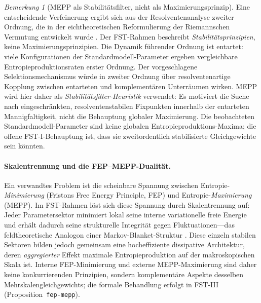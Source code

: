 \documentclass[12pt,a4paper]{article}
\theoremstyle{remark}
\newtheorem{remark}{Bemerkung}
\begin{document}
\begin{remark}[MEPP als Stabilit\"atsfilter, nicht als Maximierungsprinzip]
\label{rem:mepp-stability-filter}
Eine entscheidende Verfeinerung ergibt sich aus der Resolventenanalyse zweiter Ordnung, die in der eichtheoretischen Reformulierung der Riemannschen Vermutung entwickelt wurde \citep{GeigerRH2026b}. Der FST-Rahmen beschreibt \emph{Stabilit\"atsprinzipien}, keine Maximierungsprinzipien. Die Dynamik f\"uhrender Ordnung ist entartet: viele Konfigurationen der Standardmodell-Parameter ergeben vergleichbare Entropieproduktionsraten erster Ordnung. Der vorgeschlagene Selektionsmechanismus w\"urde in zweiter Ordnung \"uber resolventenartige Kopplung zwischen entarteten und komplement\"aren Unterr\"aumen wirken. MEPP wird hier daher als \emph{Stabilit\"atsfilter-Heuristik} verwendet: Es motiviert die Suche nach eingeschr\"ankten, resolventenstabilen Fixpunkten innerhalb der entarteten Mannigfaltigkeit, nicht die Behauptung globaler Maximierung. Die beobachteten Standardmodell-Parameter sind keine globalen Entropieproduktions-Maxima; die offene FST-I-Behauptung ist, dass sie zweitordentlich stabilisierte Gleichgewichte sein k\"onnten.
\end{remark}

\paragraph{Skalentrennung und die FEP--MEPP-Dualit\"at.}
Ein verwandtes Problem ist die scheinbare Spannung zwischen Entropie-\emph{Minimierung} (Fristons Free Energy Principle, FEP) und Entropie-\emph{Maximierung} (MEPP). Im FST-Rahmen l\"ost sich diese Spannung durch Skalentrennung auf: Jeder Parametersektor minimiert lokal seine interne variationelle freie Energie und erh\"alt dadurch seine strukturelle Integrit\"at gegen Fluktuationen---das feldtheoretische Analogon einer Markov-Blanket-Struktur \citep{Friston2010}. Diese einzeln stabilen Sektoren bilden jedoch gemeinsam eine hocheffiziente dissipative Architektur, deren \emph{aggregierter} Effekt maximale Entropieproduktion auf der makroskopischen Skala ist. Interne FEP-Minimierung und externe MEPP-Maximierung sind daher keine konkurrierenden Prinzipien, sondern komplement\"are Aspekte desselben Mehrskalengleichgewichts; die formale Behandlung erfolgt in FST-III (Proposition~\texttt{fep-mepp}).
\end{document}

